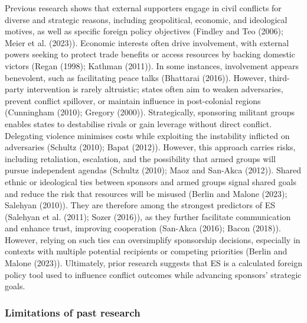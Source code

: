\documentclass[
]{article}
\begin{document}
Previous research shows that external supporters engage in civil
conflicts for diverse and strategic reasons, including geopolitical,
economic, and ideological motives, as well as specific foreign policy
objectives (Findley and Teo (2006); Meier et al. (2023)). Economic
interests often drive involvement, with external powers seeking to
protect trade benefits or access resources by backing domestic victors
(Regan (1998); Kathman (2011)). In some instances, involvement appears
benevolent, such as facilitating peace talks (Bhattarai (2016)).
However, third-party intervention is rarely altruistic; states often aim
to weaken adversaries, prevent conflict spillover, or maintain influence
in post-colonial regions (Cunningham (2010); Gregory (2000)).
Strategically, sponsoring militant groups enables states to destabilise
rivals or gain leverage without direct conflict. Delegating violence
minimises costs while exploiting the instability inflicted on
adversaries (Schultz (2010); Bapat (2012)). However, this approach
carries risks, including retaliation, escalation, and the possibility
that armed groups will pursue independent agendas (Schultz (2010); Maoz
and San-Akca (2012)). Shared ethnic or ideological ties between sponsors
and armed groups signal shared goals and reduce the risk that resources
will be misused (Berlin and Malone (2023); Salehyan (2010)). They are
therefore among the strongest predictors of ES (Salehyan et al. (2011);
Sozer (2016)), as they further facilitate communication and enhance
trust, improving cooperation (San-Akca (2016); Bacon (2018)). However,
relying on such ties can oversimplify sponsorship decisions, especially
in contexts with multiple potential recipients or competing priorities
(Berlin and Malone (2023)). Ultimately, prior research suggests that ES
is a calculated foreign policy tool used to influence conflict outcomes
while advancing sponsors' strategic goals.

\subsubsection{Limitations of past
research}\label{limitations-of-past-research}
\end{document}
